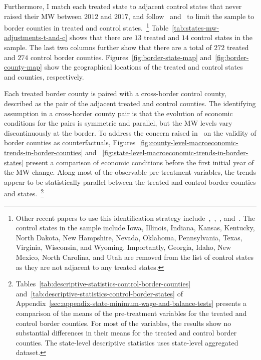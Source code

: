 \documentclass[authoryear, preprint, twocolumn, 1p]{elsarticle}
\begin{document}
    Furthermore, I match each treated state to adjacent control states that never raised their MW between $2012$ and $2017$, and follow~\citet{dube2010minimum} and~\citet{gopalan2021state} to limit the sample to border counties in treated and control states.~\footnote{\tiny Other recent papers to use this identification strategy include~\citet{aaronson2018industry},~\citet{dube2019fairness},~\citet{jardim2018minimum}, and~\citet{zhang2019distributional}. The control states in the sample include Iowa, Illinois, Indiana, Kansas, Kentucky, North Dakota, New Hampshire, Nevada, Oklahoma, Pennsylvania, Texas, Virginia, Wisconsin, and Wyoming. Importantly, Georgia, Idaho, New Mexico, North Carolina, and Utah are removed from the list of control states as they are not adjacent to any treated states.} Table~\ref{tab:states-mw-adjustments-t-and-c} shows that there are $13$ treated and $14$ control states in the sample. The last two columns further show that there are a total of $272$ treated and $274$ control border counties. Figures~\ref{fig:border-state-map} and~\ref{fig:border-county-map} show the geographical locations of the treated and control states and counties, respectively.
    
    

    Each treated border county is paired with a cross-border control county, described as the pair of the adjacent treated and control counties. The identifying assumption in a cross-border county pair is that the evolution of economic conditions for the pairs is symmetric and parallel, but the MW levels vary discontinuously at the border. To address the concern raised in~\citet{neumark2014revisiting} on the validity of border counties as counterfactuals, Figures~\ref{fig:county-level-macroeconomic-trends-in-border-counties} and ~\ref{fig:state-level-macroeconomic-trends-in-border-states} present a comparison of economic conditions before the first initial year of the MW change. Along most of the observable pre-treatment variables, the trends appear to be statistically parallel between the treated and control border counties and states.~\footnote{\tiny Tables~\ref{tab:descriptive-statistics-control-border-counties} and~\ref{tab:descriptive-statistics-control-border-states} of Appendix~\ref{sec:appendix-state-minimum-wage-and-balance-tests} presents a comparison of the means of the pre-treatment variables for the treated and control border counties. For most of the variables, the results show no substantial differences in their means for the treated and control border counties. The state-level descriptive statistics uses state-level aggregated dataset.}
\end{document}
